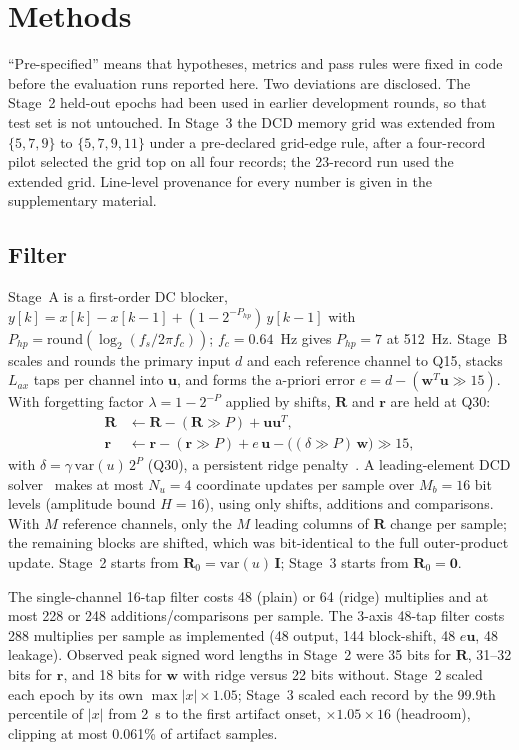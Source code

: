 \documentclass[conference]{IEEEtran}
\begin{document}
\section{Methods}
``Pre-specified'' means that hypotheses, metrics and pass rules were fixed in code before the evaluation runs reported here. Two deviations are disclosed. The Stage~2 held-out epochs had been used in earlier development rounds, so that test set is not untouched. In Stage~3 the DCD memory grid was extended from $\{5,7,9\}$ to $\{5,7,9,11\}$ under a pre-declared grid-edge rule, after a four-record pilot selected the grid top on all four records; the 23-record run used the extended grid. Line-level provenance for every number is given in the supplementary material.

\subsection{Filter}
Stage~A is a first-order DC blocker, $y[k] = x[k] - x[k-1] + (1-2^{-P_{hp}})\,y[k-1]$ with $P_{hp} = \mathrm{round}(\log_2(f_s/2\pi f_c))$; $f_c = 0.64$~Hz gives $P_{hp} = 7$ at 512~Hz. Stage~B scales and rounds the primary input $d$ and each reference channel to Q15, stacks $L_{ax}$ taps per channel into $\mathbf{u}$, and forms the a-priori error $e = d - (\mathbf{w}^T\mathbf{u} \gg 15)$. With forgetting factor $\lambda = 1-2^{-P}$ applied by shifts, $\mathbf{R}$ and $\mathbf{r}$ are held at Q30:
\begin{align}
\mathbf{R} &\leftarrow \mathbf{R} - (\mathbf{R} \gg P) + \mathbf{u}\mathbf{u}^T,\\
\mathbf{r} &\leftarrow \mathbf{r} - (\mathbf{r} \gg P) + e\,\mathbf{u} - \big((\delta \gg P)\,\mathbf{w}\big) \gg 15,
\end{align}
with $\delta = \gamma\,\mathrm{var}(u)\,2^{P}$ (Q30), a persistent ridge penalty~\cite{zakharov2013}. A leading-element DCD solver~\cite{zakharov2008,liu2009} makes at most $N_u = 4$ coordinate updates per sample over $M_b = 16$ bit levels (amplitude bound $H = 16$), using only shifts, additions and comparisons. With $M$ reference channels, only the $M$ leading columns of $\mathbf{R}$ change per sample; the remaining blocks are shifted, which was bit-identical to the full outer-product update. Stage~2 starts from $\mathbf{R}_0 = \mathrm{var}(u)\,\mathbf{I}$; Stage~3 starts from $\mathbf{R}_0 = \mathbf{0}$.

The single-channel 16-tap filter costs 48 (plain) or 64 (ridge) multiplies and at most 228 or 248 additions/comparisons per sample. The 3-axis 48-tap filter costs 288 multiplies per sample as implemented (48 output, 144 block-shift, 48 $e\mathbf{u}$, 48 leakage). Observed peak signed word lengths in Stage~2 were 35 bits for $\mathbf{R}$, 31--32 bits for $\mathbf{r}$, and 18 bits for $\mathbf{w}$ with ridge versus 22 bits without. Stage~2 scaled each epoch by its own $\max|x| \times 1.05$; Stage~3 scaled each record by the 99.9th percentile of $|x|$ from 2~s to the first artifact onset, $\times 1.05 \times 16$ (headroom), clipping at most 0.061\% of artifact samples.
\end{document}
